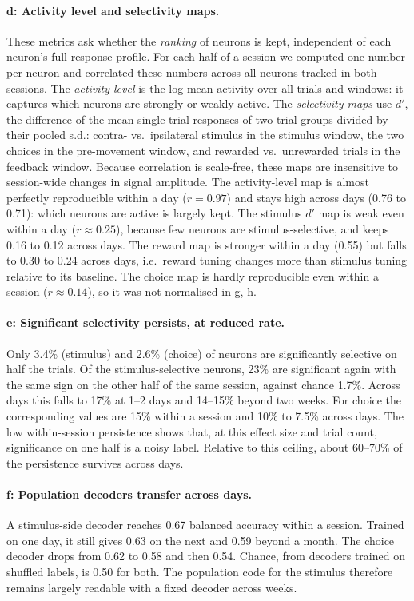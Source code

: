 \documentclass[10pt,a4paper]{article}
\begin{document}
\paragraph{d: Activity level and selectivity maps.}
These metrics ask whether the \emph{ranking} of neurons is kept, independent of each neuron's full response profile.
For each half of a session we computed one number per neuron and correlated these numbers across all neurons tracked in both sessions.
The \emph{activity level} is the log mean activity over all trials and windows: it captures which neurons are strongly or weakly active.
The \emph{selectivity maps} use $d'$, the difference of the mean single-trial responses of two trial groups divided by their pooled s.d.: contra- vs.\ ipsilateral stimulus in the stimulus window, the two choices in the pre-movement window, and rewarded vs.\ unrewarded trials in the feedback window.
Because correlation is scale-free, these maps are insensitive to session-wide changes in signal amplitude.
The activity-level map is almost perfectly reproducible within a day ($r=0.97$) and stays high across days (0.76 to 0.71): which neurons are active is largely kept.
The stimulus $d'$ map is weak even within a day ($r\approx0.25$), because few neurons are stimulus-selective, and keeps 0.16 to 0.12 across days.
The reward map is stronger within a day (0.55) but falls to 0.30 to 0.24 across days, i.e.\ reward tuning changes more than stimulus tuning relative to its baseline.
The choice map is hardly reproducible even within a session ($r\approx0.14$), so it was not normalised in g, h.

\paragraph{e: Significant selectivity persists, at reduced rate.}
Only 3.4\% (stimulus) and 2.6\% (choice) of neurons are significantly selective on half the trials.
Of the stimulus-selective neurons, 23\% are significant again with the same sign on the other half of the same session, against chance 1.7\%.
Across days this falls to 17\% at 1--2 days and 14--15\% beyond two weeks.
For choice the corresponding values are 15\% within a session and 10\% to 7.5\% across days.
The low within-session persistence shows that, at this effect size and trial count, significance on one half is a noisy label.
Relative to this ceiling, about 60--70\% of the persistence survives across days.

\paragraph{f: Population decoders transfer across days.}
A stimulus-side decoder reaches 0.67 balanced accuracy within a session.
Trained on one day, it still gives 0.63 on the next and 0.59 beyond a month.
The choice decoder drops from 0.62 to 0.58 and then 0.54. Chance, from decoders trained on shuffled labels, is 0.50 for both.
The population code for the stimulus therefore remains largely readable with a fixed decoder across weeks.
\end{document}

